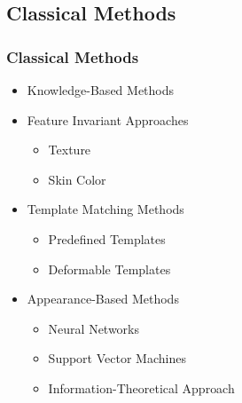 \documentclass[10pt]{beamer}
\begin{document}
\subsection{Classical Methods}
\begin{frame}
    \frametitle{Classical Methods}
   \begin{itemize}
   \item Knowledge-Based Methods
   \item Feature Invariant Approaches
      \begin{itemize}
      \item Texture
      \item Skin Color
      \end{itemize}
   \item Template Matching Methods
      \begin{itemize}
      \item Predefined Templates
       \item Deformable Templates
       \end{itemize}
   \item Appearance-Based Methods
       \begin{itemize}
       \item Neural Networks
       \item Support Vector Machines
       \item Information-Theoretical Approach
       \end{itemize}
   \end{itemize}        
\end{frame}
\end{document}
